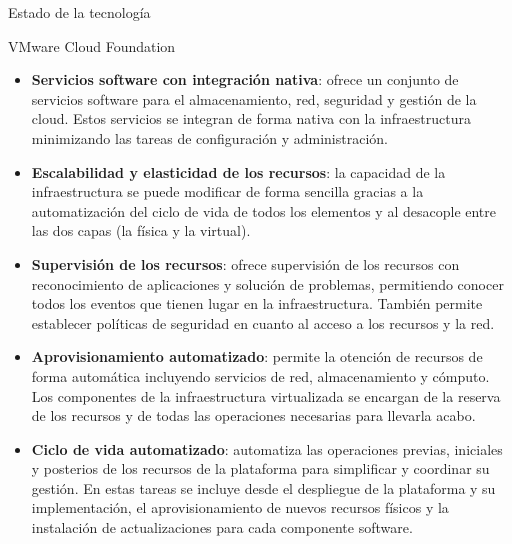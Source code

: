 \begin{section}{Estado de la tecnología}
\begin{subsection}{VMware Cloud Foundation}
\begin{itemize}
    \item \textbf{Servicios software con integración nativa}: ofrece un conjunto de servicios software para el almacenamiento, red, seguridad y gestión de la cloud. Estos servicios se integran de forma nativa con la infraestructura minimizando las tareas de configuración y administración.

    \item \textbf{Escalabilidad y elasticidad de los recursos}: la capacidad de la infraestructura se puede modificar de forma sencilla gracias a la automatización del ciclo de vida de todos los elementos y al desacople entre las dos capas (la física y la virtual).

    \item \textbf{Supervisión de los recursos}: ofrece supervisión de los recursos con reconocimiento de aplicaciones y solución de problemas, permitiendo conocer todos los eventos que tienen lugar en la infraestructura. También permite establecer políticas de seguridad en cuanto al acceso a los recursos y la red.

    \item \textbf{Aprovisionamiento automatizado}: permite la otención de recursos de forma automática incluyendo servicios de red, almacenamiento y cómputo. Los componentes de la infraestructura virtualizada se encargan de la reserva de los recursos y de todas las operaciones necesarias para llevarla acabo.

    \item \textbf{Ciclo de vida automatizado}: automatiza las operaciones previas, iniciales y posterios de los recursos de la plataforma para simplificar y coordinar su gestión. En estas tareas se incluye desde el despliegue de la plataforma y su implementación, el aprovisionamiento de nuevos recursos físicos y la instalación de actualizaciones para cada componente software.


\end{itemize}
\end{subsection}
\end{section}
